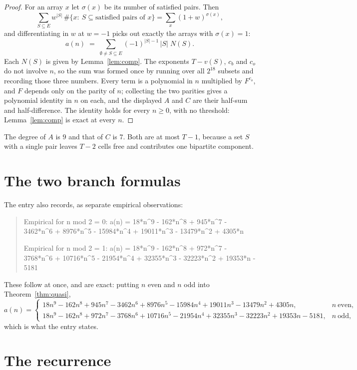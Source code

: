 \documentclass[11pt,a4paper]{article}
\theoremstyle{plain}
\theoremstyle{definition}
\begin{document}
\begin{proof}
For an array $x$ let $\sigma(x)$ be its number of satisfied pairs. Then
\[
\sum_{S\subseteq E}w^{|S|}\,\#\{x:\ S\subseteq\text{satisfied pairs of }x\}
=\sum_x (1+w)^{\sigma(x)},
\]
and differentiating in $w$ at $w=-1$ picks out exactly the arrays with $\sigma(x)=1$:
\[
a(n)\;=\;\sum_{\emptyset\neq S\subseteq E}(-1)^{|S|-1}\,|S|\;N(S).
\]
Each $N(S)$ is given by Lemma~\ref{lem:comp}. The exponents $T-v(S)$, $c_b$ and $c_o$ do not
involve $n$, so the sum was formed once by running over all $2^{18}$ subsets and
recording those three numbers. Every term is a polynomial in $n$ multiplied by $F^{c_o}$, and
$F$ depends only on the parity of $n$; collecting the two parities gives a polynomial identity
in $n$ on each, and the displayed $A$ and $C$ are their half-sum and half-difference. The
identity holds for every $n\ge0$, with no threshold: Lemma~\ref{lem:comp} is exact at every
$n$.
\end{proof}

The degree of $A$ is $9$ and that of $C$ is $7$. Both are at most $T-1$,
because a set $S$ with a single pair leaves $T-2$ cells free and contributes one bipartite
component.

\section{The two branch formulas}

The entry also records, as separate empirical observations:
\begin{quote}
Empirical for n mod 2 = 0: a(n) = 18*n\^{}9 - 162*n\^{}8 + 945*n\^{}7 - 3462*n\^{}6 + 8976*n\^{}5 - 15984*n\^{}4 + 19011*n\^{}3 - 13479*n\^{}2 + 4305*n

Empirical for n mod 2 = 1: a(n) = 18*n\^{}9 - 162*n\^{}8 + 972*n\^{}7 - 3768*n\^{}6 + 10716*n\^{}5 - 21954*n\^{}4 + 32355*n\^{}3 - 32223*n\^{}2 + 19353*n - 5181
\end{quote}
These follow at once, and are exact: putting $n$ even and $n$ odd into
Theorem~\ref{thm:quasi},
\[
a(n)=\begin{cases}
18n^{9} - 162n^{8} + 945n^{7} - 3462n^{6} + 8976n^{5} - 15984n^{4} + 19011n^{3} - 13479n^{2} + 4305n, & n\ \text{even},\\[2pt]
18n^{9} - 162n^{8} + 972n^{7} - 3768n^{6} + 10716n^{5} - 21954n^{4} + 32355n^{3} - 32223n^{2} + 19353n - 5181, & n\ \text{odd},
\end{cases}
\]
which is what the entry states.

\section{The recurrence}
\end{document}
